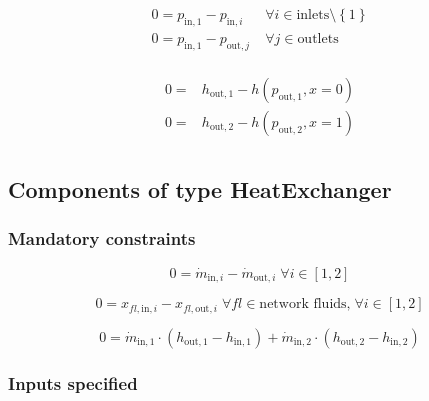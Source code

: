 \begin{equation}
\label{eq:Drum_pressure_constraints}
\begin{split}
0 = p_\mathrm{in,1} - p_{\mathrm{in,}i} & \; \forall i \in \text{inlets} \setminus \left\lbrace 1\right\rbrace\\
0 = p_\mathrm{in,1} - p_{\mathrm{out,}j} & \; \forall j \in \text{outlets}\\
\end{split}
\end{equation}

\begin{equation}
\label{eq:Drum_outlet_constraints}
\begin{split}
0 =&h_\mathrm{out,1} -h\left(p_\mathrm{out,1}, x=0\right)\\0 =&h_\mathrm{out,2} -h\left(p_\mathrm{out,2}, x=1\right)\\\end{split}
\end{equation}


\subsection{Components of type HeatExchanger}

\subsubsection{Mandatory constraints}

\begin{equation}
\label{eq:HeatExchanger_mass_flow_constraints}
0=\dot{m}_{\mathrm{in,}i}-\dot{m}_{\mathrm{out,}i}\; \forall i \in [1, 2]
\end{equation}

\begin{equation}
\label{eq:HeatExchanger_fluid_constraints}
0=x_{fl\mathrm{,in,}i}-x_{fl\mathrm{,out,}i}\;\forall fl \in\text{network fluids,}\; \forall i \in [1, 2]
\end{equation}

\begin{equation}
\label{eq:HeatExchanger_energy_balance_constraints}
0 = \dot{m}_\mathrm{in,1} \cdot \left(h_\mathrm{out,1} - h_\mathrm{in,1} \right) +\dot{m}_\mathrm{in,2} \cdot \left(h_\mathrm{out,2} - h_\mathrm{in,2} \right)
\end{equation}


\subsubsection{Inputs specified}

